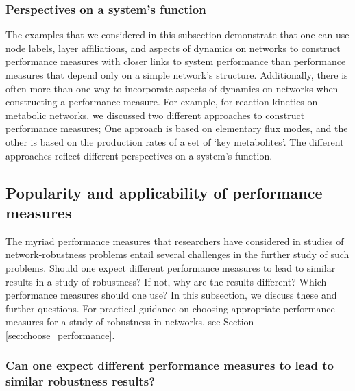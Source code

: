 \documentclass{comnet-mod}
\begin{document}
\subsubsection{Perspectives on a system's function}
The examples that we considered in this subsection demonstrate that one can use node labels, layer affiliations, and aspects of dynamics on networks to construct performance measures with closer links to system performance than performance measures that depend only on a simple network's structure. Additionally, there is often more than one way to incorporate aspects of dynamics on networks when constructing a performance measure. For example, for reaction kinetics on metabolic networks, we discussed two different approaches to construct performance measures; One approach is based on elementary flux modes, and the other is based on the production rates of a set of `key metabolites'. The different approaches reflect different perspectives on a system's function.


\subsection{Popularity and applicability of performance measures}

The myriad performance measures that researchers have considered in studies of network-robustness problems entail several challenges in the further study of such problems. Should one expect different performance measures to lead to similar results in a study of robustness? If not, why are the results different? Which performance measures should one use? In this subsection, we discuss these and further questions. For practical guidance on choosing appropriate performance measures for a study of robustness in networks, see Section \ref{sec:choose_performance}.


\subsubsection{Can one expect different performance measures to lead to similar robustness results?}
\end{document}
